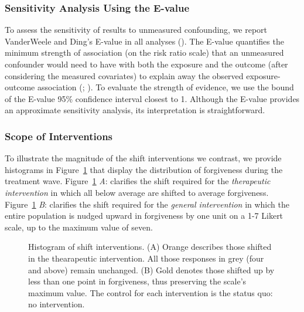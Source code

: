 \documentclass[
  single column]{article}
\begin{document}
\subsubsection{Sensitivity Analysis Using the
E-value}\label{sensitivity-analysis-using-the-e-value}

To assess the sensitivity of results to unmeasured confounding, we
report VanderWeele and Ding's E-value in all analyses
(). The E-value
quantifies the minimum strength of association (on the risk ratio scale)
that an unmeasured confounder would need to have with both the exposure
and the outcome (after considering the measured covariates) to explain
away the observed exposure-outcome association
(;
). To
evaluate the strength of evidence, we use the bound of the E-value 95\%
confidence interval closest to 1. Although the E-value provides an
approximate sensitivity analysis, its interpretation is straightforward.

\subsubsection{Scope of Interventions}\label{scope-of-interventions}

To illustrate the magnitude of the shift interventions we contrast, we
provide histograms in Figure~\ref{fig-hist} that display the
distribution of forgiveness during the treatment wave.
Figure~\ref{fig-hist} \emph{A}: clarifies the shift required for the
\emph{therapeutic intervention} in which all below average are shifted
to average forgiveness. Figure~\ref{fig-hist} \emph{B}: clarifies the
shift required for the \emph{general intervention} in which the entire
population is nudged upward in forgiveness by one unit on a 1-7 Likert
scale, up to the maximum value of seven.

\begin{figure}


\caption{\label{fig-hist}Histogram of shift interventions. (A) Orange
describes those shifted in the thearapeutic intervention. All those
responses in grey (four and above) remain unchanged. (B) Gold denotes
those shifted up by less than one point in forgiveness, thus preserving
the scale's maximum value. The control for each intervention is the
status quo: no intervention.}

\end{figure}%
\end{document}

